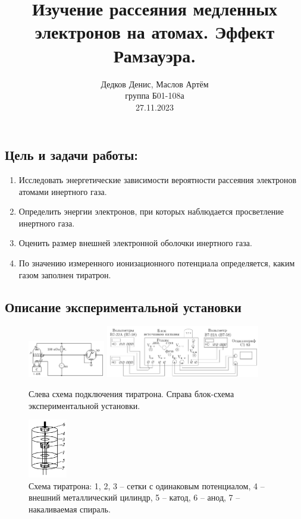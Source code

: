\documentclass[10pt,a4paper]{article}
\author{\normalsize Дедков Денис, Маслов Артём \\
	\normalsize группа Б01-108а \\
	\normalsize 27.11.2023}
\date{}
\title{
	\Large Изучение рассеяния медленных электронов на атомах. Эффект Рамзауэра. \\ 
}
\begin{document}
\maketitle
	
	\subsection*{Цель и задачи работы:}
	\begin{enumerate}
		\item Исследовать энергетические зависимости вероятности рассеяния электронов атомами инертного газа. 
		
		\item Определить энергии электронов, при которых наблюдается просветление инертного газа.
		
		\item Оценить размер внешней электронной оболочки инертного газа.
		
		\item По значению измеренного ионизационного потенциала определяется, каким газом заполнен тиратрон.
	\end{enumerate}
	
	\subsection*{Описание экспериментальной установки}
	
	\begin{figure}[H]
		\centering
		\includegraphics[width=0.3\textwidth]{img/schm1.png}
		\includegraphics[width=0.6\textwidth]{img/schm2.png}
		\caption{Слева схема подключения тиратрона. Справа блок-схема экспериментальной установки.}
		\label{img:exp_scheme}
	\end{figure}

	\begin{figure}
		\centering
		\includegraphics[width=0.15\textwidth]{img/tiratron.png}
		\caption{Схема тиратрона: 1, 2, 3 -- сетки с одинаковым потенциалом, 4 -- внешний металлический цилиндр, 5 -- катод, 6 -- анод, 7 -- накаливаемая спираль.}
		\label{img:tiratron}
	\end{figure}
\end{document}
